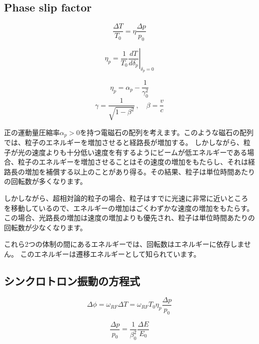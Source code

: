 \documentclass[10pt,a4paper]{ltjsarticle}
\begin{document}
\subsection{Phase slip factor}
\begin{equation}
    \frac{\Delta T}{T_0}=\eta\frac{\Delta p}{p_0}
    \label{slip}
\end{equation}

\begin{equation}
    \eta_p = \frac{1}{T_0}\left. \frac{dT}{d\delta_p}\right|_{\delta_p = 0}
\end{equation}

\begin{equation}
    \eta_p=\alpha_p - \frac{1}{\gamma_0^2}
    \label{alppha_slip}
\end{equation}
\begin{equation}
    \gamma = \frac{1}{\sqrt{1-\beta^2}}\, , \quad \beta = \frac{v}{c}
\end{equation}

正の運動量圧縮率$\alpha_p>0$を持つ電磁石の配列を考えます。このような磁石の配列では、粒子のエネルギーを増加させると経路長が増加する。 しかしながら、粒子が光の速度よりも十分低い速度を有するようにビームが低エネルギーである場合、粒子のエネルギーを増加させることはその速度の増加をもたらし、それは経路長の増加を補償する以上のことがあり得る。その結果、粒子は単位時間あたりの回転数が多くなります。

しかしながら、超相対論的粒子の場合、粒子はすでに光速に非常に近いところを移動しているので、エネルギーの増加はごくわずかな速度の増加をもたらす。 この場合、光路長の増加は速度の増加よりも優先され、粒子は単位時間あたりの回転数が少なくなります。

これら2つの体制の間にあるエネルギーでは、回転数はエネルギーに依存しません。 このエネルギーは遷移エネルギーとして知られています。

\subsection{シンクロトロン振動の方程式}
%
\begin{equation}
    \Delta \phi = \omega_{RF} \Delta T = \omega_{RF} T_0 \eta_p\frac{\Delta p}{p_0}
\end{equation}

\begin{equation}
    \frac{\Delta p}{p_0} = \frac{1}{\beta_0^2}\frac{\Delta E}{E_0}
    \label{delta_p}
\end{equation}
\end{document}

